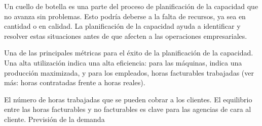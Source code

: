 \documentclass[
  paper=a4,
  ,captions=tableheading
]{scrartcl}
\providecommand{\tightlist}{%
  \setlength{\itemsep}{0pt}\setlength{\parskip}{0pt}}
\begin{document}
\begin{description}
\tightlist
\item[Cuellos de botella]
Un cuello de botella es una parte del proceso de planificación de la
capacidad que no avanza sin problemas. Esto podría deberse a la falta de
recursos, ya sea en cantidad o en calidad. La planificación de la
capacidad ayuda a identificar y resolver estas situaciones antes de que
afecten a las operaciones empresariales.
\item[Utilización de recursos]
Una de las principales métricas para el éxito de la planificación de la
capacidad. Una alta utilización indica una alta eficiencia: para las
máquinas, indica una producción maximizada, y para los empleados, horas
facturables trabajadas (ver más: horas contratadas frente a horas
reales).
\item[Horas facturables]
El número de horas trabajadas que se pueden cobrar a los clientes. El
equilibrio entre las horas facturables y no facturables es clave para
las agencias de cara al cliente. Previsión de la demanda


\end{description}
\end{document}
